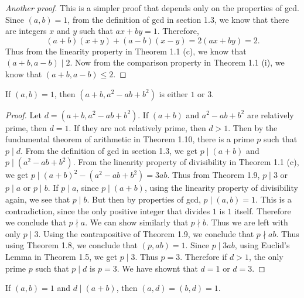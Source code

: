 \begin{proof}[Another proof]
  This is a simpler proof that depends only on the properties of gcd.
  Since \( (a, b) = 1 \), from the definition of gcd in section 1.3,
  we know that there are integers \( x \) and \( y \) such that \( ax
  + by = 1 \). Therefore,
  \[ (a + b)(x + y) + (a - b)(x - y) = 2(ax + by) = 2. \]
  Thus from the linearity property in Theorem 1.1 (c), we know that \(
  (a + b, a - b) \mid 2 \). Now from the comparison property in
  Theorem 1.1 (i), we know that \( (a + b, a - b) \le 2 \).
\end{proof}


\begin{exercise}{5}{}
  If \( (a, b) = 1 \), then \( (a + b, a^2 - ab + b^2) \) is either \(
  1 \) or \( 3 \).
\end{exercise}

\begin{proof}
  Let \( d = (a + b, a^2 - ab + b^2) \). If \( (a + b) \) and \( a^2 -
  ab + b^2 \) are relatively prime, then \( d = 1 \). If they are not
  relatively prime, then \( d > 1 \). Then by the fundamental theorem
  of arithmetic in Theorem 1.10, there is a prime \( p \) such that \(
  p \mid d \). From the definition of gcd in section 1.3, we get \( p
  \mid (a + b) \) and \( p \mid (a^2 - ab + b^2) \). From the
  linearity property of divisibility in Theorem 1.1 (c), we get \( p
  \mid (a + b)^2 - (a^2 - ab + b^2) = 3ab \). Thus from Theorem 1.9,
  \( p \mid 3 \) or \( p \mid a \) or \( p \mid b \). If \( p \mid a
  \), since \( p \mid (a + b) \), using the linearity property of
  divisibility again, we see that \( p \mid b \). But then by
  properties of gcd, \( p \mid (a, b) = 1 \). This is a contradiction,
  since the only positive integer that divides \( 1 \) is \( 1 \)
  itself. Therefore we conclude that \( p \nmid a \). We can show
  similarly that \( p \nmid b \). Thus we are left with only \( p \mid
  3 \). Using the contrapositive of Theorem 1.9, we conclude that \( p
  \nmid ab \). Thus using Theorem 1.8, we conclude that \( (p, ab) = 1
  \). Since \( p \mid 3ab \), using Euclid's Lemma in Theorem 1.5, we
  get \( p \mid 3 \). Thus \( p = 3 \). Therefore if \( d > 1 \), the
  only prime \( p \) such that \( p \mid d \) is \( p = 3 \). We have
  shownt that \( d = 1 \) or \( d = 3 \).
\end{proof}


\begin{exercise}{6}{}
  If \( (a, b) = 1 \) and \( d \mid (a + b) \), then \( (a, d) = (b, d) = 1 \).
\end{exercise}

